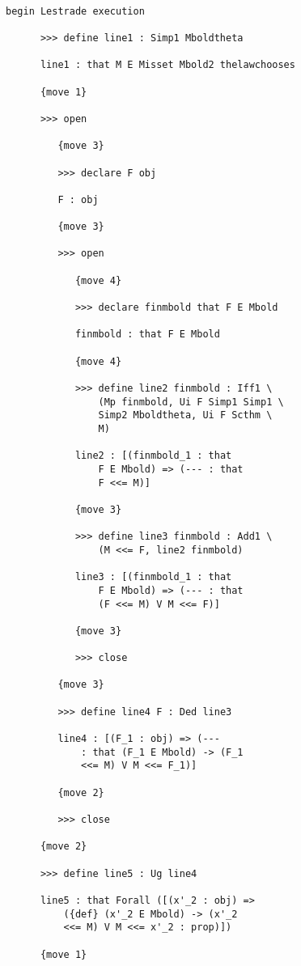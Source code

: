 \documentclass[12pt]{article}
\begin{document}
\begin{verbatim}

begin Lestrade execution

      >>> define line1 : Simp1 Mboldtheta

      line1 : that M E Misset Mbold2 thelawchooses

      {move 1}

      >>> open

         {move 3}

         >>> declare F obj

         F : obj

         {move 3}

         >>> open

            {move 4}

            >>> declare finmbold that F E Mbold

            finmbold : that F E Mbold

            {move 4}

            >>> define line2 finmbold : Iff1 \
                (Mp finmbold, Ui F Simp1 Simp1 \
                Simp2 Mboldtheta, Ui F Scthm \
                M)

            line2 : [(finmbold_1 : that 
                F E Mbold) => (--- : that 
                F <<= M)]

            {move 3}

            >>> define line3 finmbold : Add1 \
                (M <<= F, line2 finmbold)

            line3 : [(finmbold_1 : that 
                F E Mbold) => (--- : that 
                (F <<= M) V M <<= F)]

            {move 3}

            >>> close

         {move 3}

         >>> define line4 F : Ded line3

         line4 : [(F_1 : obj) => (--- 
             : that (F_1 E Mbold) -> (F_1 
             <<= M) V M <<= F_1)]

         {move 2}

         >>> close

      {move 2}

      >>> define line5 : Ug line4

      line5 : that Forall ([(x'_2 : obj) => 
          ({def} (x'_2 E Mbold) -> (x'_2 
          <<= M) V M <<= x'_2 : prop)])

      {move 1}


\end{verbatim}
\end{document}
